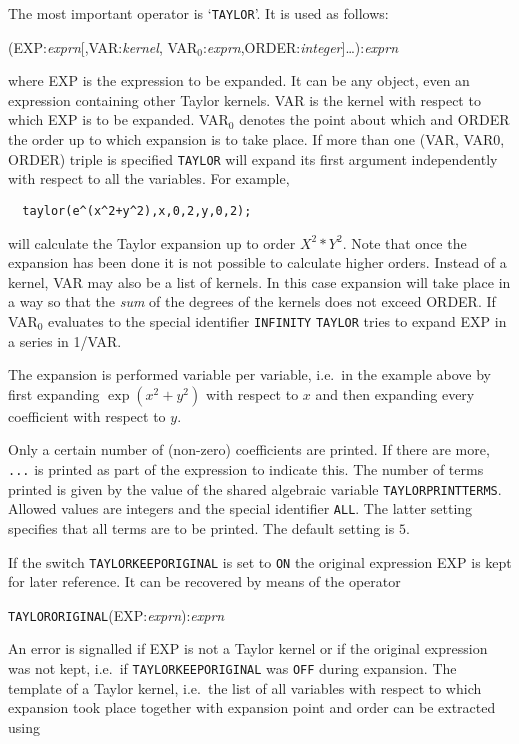 The most important operator is `\verb+TAYLOR+'. 
It is used as follows:

(EXP:{\em exprn}[,VAR:{\em kernel},
            VAR$_0$:{\em exprn},ORDER:{\em integer}]\ldots):{\em exprn}

where EXP is the expression to be expanded. It can be any \REDUCE{}
object, even an expression containing other Taylor kernels.  VAR is
the kernel with respect to which EXP is to be expanded. VAR$_0$
denotes the point about which and ORDER the order up to which
expansion is to take place. If more than one (VAR, VAR0, ORDER) triple
is specified {\tt TAYLOR} will expand its first argument independently
with respect to all the variables. For example,

\begin{verbatim}
  taylor(e^(x^2+y^2),x,0,2,y,0,2);
\end{verbatim}

will calculate the Taylor expansion up to order $X^{2}*Y^{2}$.
Note that once the expansion has been done it is not possible to 
calculate higher orders.
Instead of a kernel, VAR may also
be a list of kernels. In this case expansion will take place in a way
so that the {\em sum\/} of the degrees of the kernels does not exceed
ORDER.
If VAR$_0$ evaluates to the special identifier \verb|INFINITY|
{\tt TAYLOR} tries to expand EXP in a series in 1/VAR.

The expansion is performed variable per variable, i.e.\ in the example
above by first expanding $\exp(x^{2}+y^{2})$ with respect to $x$ and
then expanding every coefficient with respect to $y$.

Only a certain number of (non-zero) coefficients are printed. If there
are more, \verb|...| is printed as part of the expression to indicate
this. The number of terms printed is given by the value of the shared
algebraic variable \verb|TAYLORPRINTTERMS|.  Allowed values are
integers and the special identifier \verb|ALL|. The latter setting
specifies that all terms are to be printed. The default setting is
$5$.


If the switch \verb|TAYLORKEEPORIGINAL| is set to \verb|ON| the
original expression EXP is kept for later reference.
It can be recovered by means of the operator

\hspace*{2em} {\tt TAYLORORIGINAL}(EXP:{\em exprn}):{\em exprn}

An error is signalled if EXP is not a Taylor kernel or if the original
expression was not kept, i.e.\ if \verb|TAYLORKEEPORIGINAL| was
\verb|OFF| during expansion.  The template of a Taylor kernel, i.e.\
the list of all variables with respect to which expansion took place
together with expansion point and order can be extracted using

